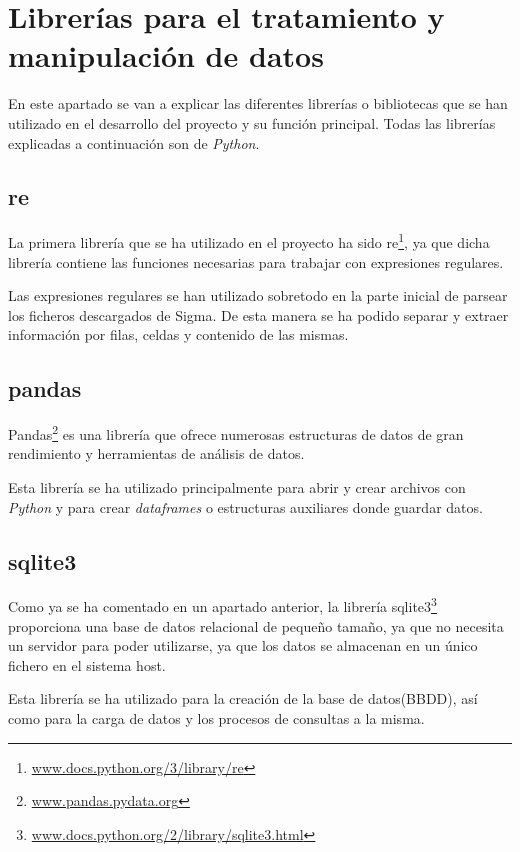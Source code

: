\section{Librerías para el tratamiento y manipulación de datos}\label{librerias}
En este apartado se van a explicar las diferentes librerías o bibliotecas que se han utilizado en el desarrollo del proyecto y su función principal. Todas las librerías explicadas a continuación son de \emph{Python}.

\subsection{re}
La primera librería que se ha utilizado en el proyecto ha sido re\footnote{\href {https://docs.python.org/3/library/re.html}{www.docs.python.org/3/library/re}}, ya que dicha librería contiene las funciones necesarias para trabajar con expresiones regulares.

Las expresiones regulares se han utilizado sobretodo en la parte inicial de parsear los ficheros descargados de Sigma. De esta manera se ha podido separar y extraer información por filas, celdas y contenido de las mismas.


\subsection{pandas}
Pandas\footnote{\href{https://pandas.pydata.org/}{www.pandas.pydata.org}} es una librería que ofrece numerosas estructuras de datos de gran rendimiento y herramientas de análisis de datos.

Esta librería se ha utilizado principalmente para abrir y crear archivos con \emph{Python} y para crear \emph{dataframes} o estructuras auxiliares donde guardar datos.  


\subsection{sqlite3}
Como ya se ha comentado en un apartado anterior, la librería sqlite3\footnote{\href{https://docs.python.org/2/library/sqlite3.html}{www.docs.python.org/2/library/sqlite3.html}} proporciona una base de datos relacional de pequeño tamaño, ya que no necesita un servidor para poder utilizarse, ya que los datos se almacenan en un único fichero en el sistema host.

Esta librería se ha utilizado para la creación de la base de datos(BBDD), así como para la carga de datos y los procesos de consultas a la misma.

